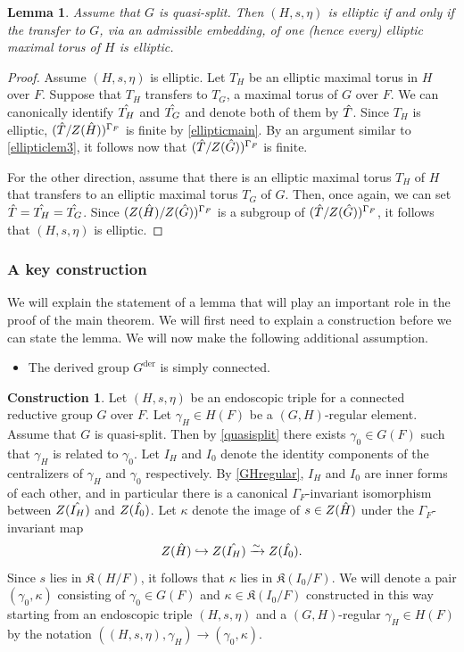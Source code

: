 \documentclass[11pt,a4paper]{article}
\theoremstyle{definition}
\newtheorem{const}[shared]{Construction}
\theoremstyle{plain}
\newtheorem{Le}[shared]{Lemma}
\theoremstyle{remark}
\theoremstyle{plain}
\begin{document}
\begin{Le}
    Assume that $G$ is quasi-split. Then $(H,s,\eta)$ is elliptic if and only if the transfer to $G$, via an admissible embedding, of one (hence every) elliptic maximal torus of $H$ is elliptic.
\end{Le}
\begin{proof}
    Assume $(H,s,\eta)$ is elliptic. Let $T_H$ be an elliptic maximal torus in $H$ over $F$. Suppose that $T_H$ transfers to $T_G$, a maximal torus of $G$ over $F$. We can canonically identify $\Hat{T_H}$ and $\Hat{T_G}$ and denote both of them by $\Hat{T}$. Since $T_H$ is elliptic, $(\Hat{T}/Z(\Hat{H}))^{\Gamma_F}$ is finite by \ref{ellipticmain}. By an argument similar to \ref{ellipticlem3}, it follows now that $(\Hat{T} / Z(\Hat{G}))^{\Gamma_F}$ is finite.

    For the other direction, assume that there is an elliptic maximal torus $T_H$ of $H$ that transfers to an elliptic maximal torus $T_G$ of $G$. Then, once again, we can set $\Hat{T} = \Hat{T_H} = \Hat{T_G}$. Since $(Z(\Hat{H})/Z(\Hat{G}))^{\Gamma_F}$ is a subgroup of $(\Hat{T} / Z(\Hat{G}))^{\Gamma_F}$, it follows that $(H,s,\eta)$ is elliptic.
\end{proof}

\subsubsection{A key construction}
We will explain the statement of a lemma that will play an important role in the proof of the main theorem. We will first need to explain a construction before we can state the lemma. We will now make the following additional assumption.
\begin{itemize}
    \item The derived group $G^{\text{der}}$ is simply connected.
\end{itemize}

\begin{const}\label{prestabconst}
    Let $(H,s,\eta)$ be an endoscopic triple for a connected reductive group $G$ over $F$. Let $\gamma_H \in H(F)$ be a $(G,H)$-regular element. Assume that $G$ is quasi-split. Then by \ref{quasisplit} there exists $\gamma_0 \in G(F)$ such that $\gamma_H$ is related to $\gamma_0$. Let $I_H$ and $I_0$ denote the identity components of the centralizers of $\gamma_H$ and $\gamma_0$ respectively. By \ref{GHregular}, $I_H$ and $I_0$ are inner forms of each other, and in particular there is a canonical $\Gamma_F$-invariant isomorphism between $Z(\Hat{I_H})$ and $Z(\Hat{I_0})$. Let $\kappa$ denote the image of $s \in Z(\Hat{H})$ under the $\Gamma_F$-invariant map
    $$ Z(\Hat{H}) \hookrightarrow Z(\Hat{I_H}) \xrightarrow[]{\sim} Z(\Hat{I_0}).$$
    Since $s$ lies in $\mathfrak{K}(H/F)$, it follows that $\kappa$ lies in $\mathfrak{K}(I_0/F)$. We will denote a pair $(\gamma_0, \kappa)$ consisting of $\gamma_0 \in G(F)$ and $\kappa \in \mathfrak{K}(I_0/F)$ constructed in this way starting from an endoscopic triple $(H,s,\eta)$ and a $(G,H)$-regular $\gamma_H \in H(F)$ by the notation $((H,s,\eta), \gamma_H) \rightarrow (\gamma_0, \kappa)$.
\end{const}
\end{document}

